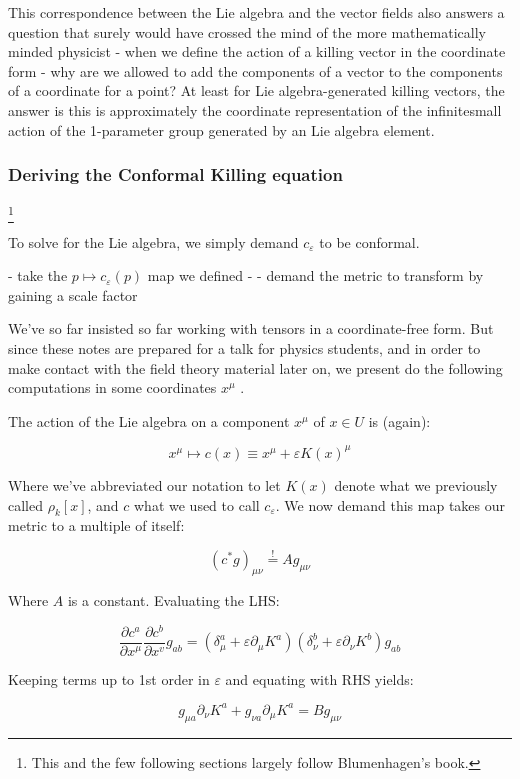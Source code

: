 This correspondence between the Lie algebra and the vector fields also answers a question that surely would have crossed the mind of the more mathematically minded physicist - when we define the action of a killing vector in the coordinate form - why are we allowed to add the components of a vector to the components of a coordinate for a point? At least for Lie algebra-generated killing vectors, the answer is this is approximately the coordinate representation of the infinitesmall action of the 1-parameter group generated by an Lie algebra element.


\subsubsection{ Deriving the Conformal Killing equation} \footnote{This and the few following sections largely follow Blumenhagen's book.}

To solve for the Lie algebra, we simply demand $c_\varepsilon$ to be conformal. 

- take the $p \mapsto c_\varepsilon(p)$ map we defined -
-  demand the metric to transform by gaining a scale factor

We've so far insisted so far working with tensors in a coordinate-free form. But since these notes are prepared for a talk for physics students, and in order to make contact with the field theory material later on, we present do the following computations in some coordinates $x^\mu$ .

The action of the Lie algebra on a component $x^\mu$ of $x \in U$ is (again):

$$x^\mu \mapsto c(x) \equiv x^\mu +\varepsilon K(x)^\mu $$

Where we've abbreviated our notation to let $K(x)$ denote what we previously called $\rho_k[x]$, and $c$ what we used to call $c_\varepsilon$. We now demand this map takes our metric to a multiple of itself:

$$(c^*g)_{\mu\nu} \overset{!}{=} A g_{\mu\nu}$$

Where $A$ is a constant.  Evaluating the LHS:

 $$\frac{\partial c^a}{\partial x^\mu} \frac{\partial c^b}{\partial x^v} g_{ab} = (\delta^a_\mu + \varepsilon \partial_\mu K^a) (\delta^b_\nu + \varepsilon \partial_\nu K^b)g_{ab}
$$

Keeping terms up to 1st order in $\varepsilon$ and equating with RHS yields:

$$g_{\mu a}\partial_\nu K^a + g_{\nu a}\partial_\mu K^a = Bg_{\mu\nu}$$

